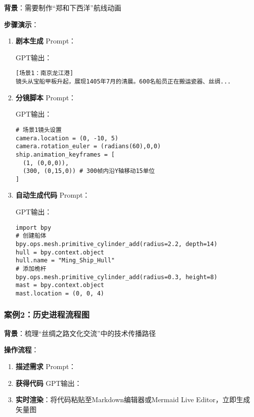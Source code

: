 \textbf{背景}：需要制作``郑和下西洋''航线动画

\textbf{步骤演示}：

\begin{enumerate}
\def\labelenumi{\arabic{enumi}.}
\item
  \textbf{剧本生成}
  Prompt：

  GPT输出：

\begin{lstlisting}
[场景1：南京龙江港] 
镜头从宝船甲板升起，展现1405年7月的清晨。600名船员正在搬运瓷器、丝绸...
\end{lstlisting}
\item
  \textbf{分镜脚本}
  Prompt：

  GPT输出：

\begin{lstlisting}
# 场景1镜头设置
camera.location = (0, -10, 5)
camera.rotation_euler = (radians(60),0,0)
ship.animation_keyframes = [
  (1, (0,0,0)), 
  (300, (0,15,0)) # 300帧内沿Y轴移动15单位
]
\end{lstlisting}
\item
  \textbf{自动生成代码} Prompt：

  GPT输出：

\begin{lstlisting}
import bpy
# 创建船体
bpy.ops.mesh.primitive_cylinder_add(radius=2.2, depth=14)
hull = bpy.context.object
hull.name = "Ming_Ship_Hull"
# 添加桅杆
bpy.ops.mesh.primitive_cylinder_add(radius=0.3, height=8)
mast = bpy.context.object
mast.location = (0, 0, 4)
\end{lstlisting}
\end{enumerate}

\hypertarget{ux6848ux4f8b2ux5386ux53f2ux8fdbux7a0bux6d41ux7a0bux56fe}{%
\subsubsection{案例2：历史进程流程图}\label{ux6848ux4f8b2ux5386ux53f2ux8fdbux7a0bux6d41ux7a0bux56fe}}

\textbf{背景}：梳理``丝绸之路文化交流''中的技术传播路径

\textbf{操作流程}：

\begin{enumerate}
\def\labelenumi{\arabic{enumi}.}
\item
  \textbf{描述需求}
  Prompt：
\item
  \textbf{获得代码} GPT输出：
\item
  \textbf{实时渲染}：将代码粘贴至Markdown编辑器或Mermaid Live
  Editor，立即生成矢量图
\end{enumerate}

